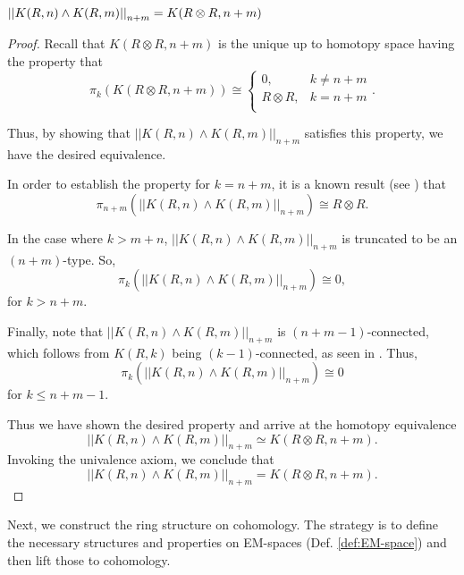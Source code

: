 \documentclass{amsart}
\begin{document}

\begin{proposition}\label{prop:K_smash}
	$ \left| \left| K(R,n) \wedge K(R,m)\right| \right|_{n+m} = K(R \otimes R, n+m)$
\end{proposition} 

\begin{proof}
	Recall that $K(R \otimes R, n+m)$ is the unique up to homotopy space
	having the property that
	\[
	\pi_k (K(R \otimes R, n+m )) \cong
	\begin{cases}
	0, & k \neq n+m \\
	R \otimes R, & k= n+m \\
	\end{cases}
	.\]
	
	Thus, by showing that $ || K(R,n) \wedge K(R,m) ||_{n+m} $
	satisfies this property, we have the desired
	equivalence. 
	
	In order to establish the property for $k=n+m$, it is a known result (see \cite[Prop 19.60]{strom:mcht}) that
	\[
	\pi_{n+m} ( || K(R,n) \wedge K(R,m) ||_{n+m} )
	\cong R \otimes R.
	\]
	
	In the case where $k>m+n$, 
	 $ || K(R,n) \wedge K(R,m) ||_{n+m} $
	is truncated to be an $ ( n+m ) $-type. So, \[
	\pi_k ( || K(R,n) \wedge K(R,m) ||_{n+m} )
	\cong 0,
	\] for $k>n+m$. 
	
	Finally, note that  
	$ || K(R,n) \wedge K(R,m) ||_{n+m} $ is
	$ ( n+m-1 ) $-connected, which follows from $ K( R,k ) $ being
	$ ( k-1 ) $-connected, as seen in \cite[Prop 4.3.1]{brunerie:thesis}.
	Thus,
	\[
	\pi_k (|| K(R,n) \wedge K(R,m) ||_{n+m} ) \cong 0
	\]
	for $ k \leq n+m-1 $.
	
	Thus we have shown the desired property and arrive at the homotopy equivalence 
	\[
	|| K(R,n) \wedge K(R,m) ||_{n+m} \simeq
	K (R \otimes R, n+m ).
	\]
	Invoking the univalence axiom, we conclude that
	\[
	|| K(R,n) \wedge K(R,m) ||_{n+m} =
	K (R \otimes R, n+m ).
	\]
\end{proof}



Next, we construct the ring structure on cohomology. The
strategy is to define the necessary structures and properties on EM-spaces (Def. \ref{def:EM-space})
and then lift those to cohomology.
\end{document}
